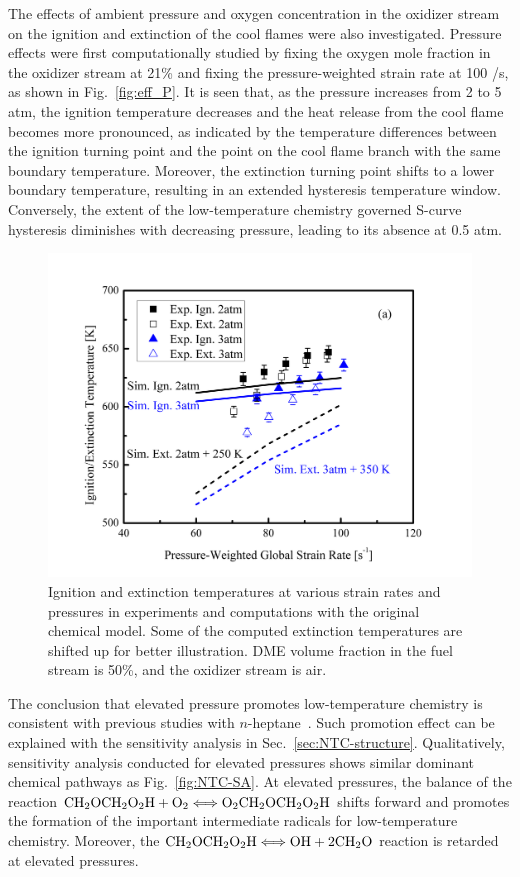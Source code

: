 The effects of ambient pressure and oxygen concentration in the oxidizer stream on the ignition and extinction of the cool flames were also investigated.  Pressure effects were first computationally studied by fixing the oxygen mole fraction in the oxidizer stream at 21\% and fixing the pressure-weighted strain rate at 100 /s, as shown in Fig.~\ref{fig:eff_P}.  It is seen that, as the pressure increases from 2 to 5 atm, the ignition temperature decreases and the heat release from the cool flame becomes more pronounced, as indicated by the temperature differences between the ignition turning point and the point on the cool flame branch with the same boundary temperature.  Moreover, the extinction turning point shifts to a lower boundary temperature, resulting in an extended hysteresis temperature window.  Conversely, the extent of the low-temperature chemistry governed S-curve hysteresis diminishes with decreasing pressure, leading to its absence at 0.5 atm.

\begin{figure}[t]
  \centering
  \scriptsize
  \includegraphics[width=1.0\textwidth]{ch-NTC/cmp_P.png}
  \normalsize
  \caption{Ignition and extinction temperatures at various strain rates and pressures in experiments and computations with the original chemical model.  Some of the computed extinction temperatures are shifted up for better illustration.  DME volume fraction in the fuel stream is 50\%, and the oxidizer stream is air.}
  \label{fig:cmp_P_ori}
\end{figure}

The conclusion that elevated pressure promotes low-temperature chemistry is consistent with previous studies with $n$-heptane~\cite{law12}.  Such promotion effect can be explained with the sensitivity analysis in Sec.~\ref{sec:NTC-structure}.  Qualitatively, sensitivity analysis conducted for elevated pressures shows similar dominant chemical pathways as Fig.~\ref{fig:NTC-SA}.  At elevated pressures, the balance of the reaction $\rm{CH}_2\rm{OCH}_2\rm{O}_2\rm{H} + \rm{O}_2 \Longleftrightarrow \rm{O}_2\rm{CH}_2\rm{OCH}_2\rm{O}_2\rm{H}$ shifts forward and promotes the formation of the important intermediate radicals for low-temperature chemistry.  Moreover, the $\rm{CH}_2\rm{OCH}_2\rm{O}_2\rm{H} \Longleftrightarrow \rm{OH} + 2\rm{CH}_2\rm{O}$ reaction is retarded at elevated pressures.

